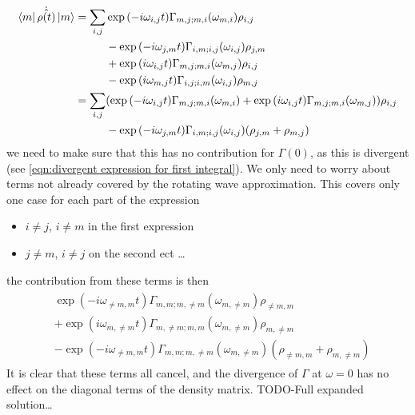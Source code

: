 \begin{align}
    \bra{m}\dot{\hat{\rho{}(t)}} \ket{m} & = \begin{aligned}[t]
        \sum_{i,j} &
        \exp{(-i\omega_{i,j} t)}
        \Gamma_{m,j;m, i}(\omega_{m,i})
        \rho_{i,j}   \\
                   &
        -\exp{(-i\omega_{j,m} t)}
        \Gamma_{i,m;i, j}(\omega_{i,j})
        \rho_{j, m}  \\
                   &
        +\exp{(i\omega_{i,j} t)}
        \Gamma_{m,j; m, i}(\omega_{m,j})
        \rho_{i, j}  \\
                   &
        -\exp{(i\omega_{m,j} t)}
        \Gamma_{i,j; i, m}(\omega_{i,j})
        \rho_{m, j}
    \end{aligned} \\
                                         & = \begin{aligned}[t]
        \sum_{i,j} &
        (\exp{(-i\omega_{i,j} t)}
        \Gamma_{m,j;m, i}(\omega_{m,i})
        +\exp{(i\omega_{i,j} t)}
        \Gamma_{m,j; m, i}(\omega_{m,j})
        )\rho_{i,j}                 \\
                   &
        -\exp{(-i\omega_{j,m} t)}
        \Gamma_{i,m;i, j}(\omega_{i,j})
        (\rho_{j, m} + \rho_{m, j}) \\
    \end{aligned}
\end{align}
we need to make sure that this
has no contribution for
\(\Gamma(0)\), as this is divergent
(see \cref{eqn:divergent expression for first integral}).
We only need
to worry about terms not already
covered by the rotating wave approximation.
This covers only one case for each part of
the expression
\begin{itemize}
    \item \(i \neq j\), \(i \neq m\) in the
          first expression
    \item \(j\neq m\), \(i \neq j\) on the
          second ect \ldots
\end{itemize}
the contribution from these
terms is then
\begin{align}
    \begin{aligned}
         & \exp{(-i\omega_{\neq m,m} t)}
        \Gamma_{m,m;m, \neq m}(\omega_{m,\neq m})
        \rho_{\neq m,m}                  \\
         &
        +\exp{(i\omega_{m,\neq m} t)}
        \Gamma_{m,\neq m; m, m}(\omega_{m,\neq m})
        \rho_{m,\neq m}                  \\
         &
        -\exp{(-i\omega_{\neq m,m} t)}
        \Gamma_{m,m;m, \neq m}(\omega_{m,\neq m})
        (\rho_{\neq m, m} + \rho_{m, \neq m})
    \end{aligned}
\end{align}
It is clear that these terms all cancel,
and the divergence of \(\Gamma \) at \(\omega = 0\)
has no effect on the diagonal terms of the
density matrix. TODO-Full expanded solution\ldots